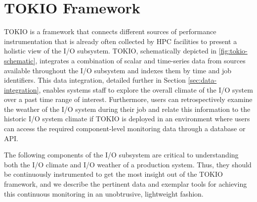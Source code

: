 \section{TOKIO Framework} \label{sec:methods}

TOKIO is a framework that connects different sources of performance instrumentation that is already often collected by HPC facilities to present a holistic view of the I/O subsystem.
TOKIO, schematically depicted in \ref{fig:tokio-schematic}, integrates a combination of scalar and time-series data from sources available throughout the I/O subsystem and indexes them by time and job identifiers.
This data integration, detailed further in Section \ref{sec:data-integration}, enables systems staff to explore the overall climate of the I/O system over a past time range of interest.
Furthermore, users can retrospectively examine the weather of the I/O system during their job and relate this information to the historic I/O system climate if TOKIO is deployed in an environment where users can access the required component-level monitoring data through a database or API.

The following components of the I/O subsystem are critical to understanding both the I/O climate and I/O weather of a production system.
Thus, they should be continuously instrumented to get the most insight out of the TOKIO framework, and we describe the pertinent data and exemplar tools for achieving this continuous monitoring in an unobtrusive, lightweight fashion.

